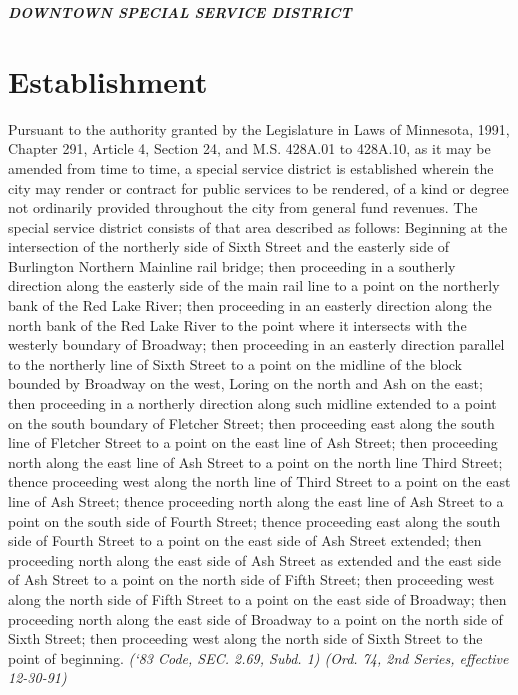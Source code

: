 \documentclass[code.tex]{subfiles}
\begin{document}
\centerline{\textbf{\emph{\LARGE{DOWNTOWN SPECIAL SERVICE DISTRICT}}}}
\setcounter{section}{14}
\section{Establishment}
Pursuant to the authority granted by the Legislature in Laws of Minnesota, 1991, Chapter 291, Article 4, Section 24, and M.S. \textsection 428A.01 to \textsection 428A.10, as it may be amended from time to time, a special service district is established wherein the city may render or contract for public services to be rendered, of a kind or degree not ordinarily provided throughout the city from general fund revenues. The special service district consists of that area described as follows:\newline
\newline
Beginning at the intersection of the northerly side of Sixth Street and the easterly side of Burlington Northern Mainline rail bridge; then proceeding in a southerly direction along the easterly side of the main rail line to a point on the northerly bank of the Red Lake River; then proceeding in an easterly direction along the north bank of the Red Lake River to the point where it intersects with the westerly boundary of Broadway; then proceeding in an easterly direction parallel to the northerly line of Sixth Street to a point on the midline of the block bounded by Broadway on the west, Loring on the north and Ash on the east; then proceeding in a northerly direction along such midline extended to a point on the south boundary of Fletcher Street; then proceeding east along the south line of Fletcher Street to a point on the east line of Ash Street; then proceeding north along the east line of Ash Street to a point on the north line Third Street; thence proceeding west along the north line of Third Street to a point on the east line of Ash Street; thence proceeding north along the east line of Ash Street to a point on the south side of Fourth Street; thence proceeding east along the south side of Fourth Street to a point on the east side of Ash Street extended; then proceeding north along the east side of Ash Street as extended and the east side of Ash Street to a point on the north side of Fifth Street; then proceeding west along the north side of Fifth Street to a point on the east side of Broadway; then proceeding north along the east side of Broadway to a point on the north side of Sixth Street; then proceeding west along the north side of Sixth Street to the point of beginning.\newline
\emph{(‘83 Code, SEC. 2.69, Subd. 1) (Ord. 74, 2nd Series, effective 12-30-91)}
\end{document}
